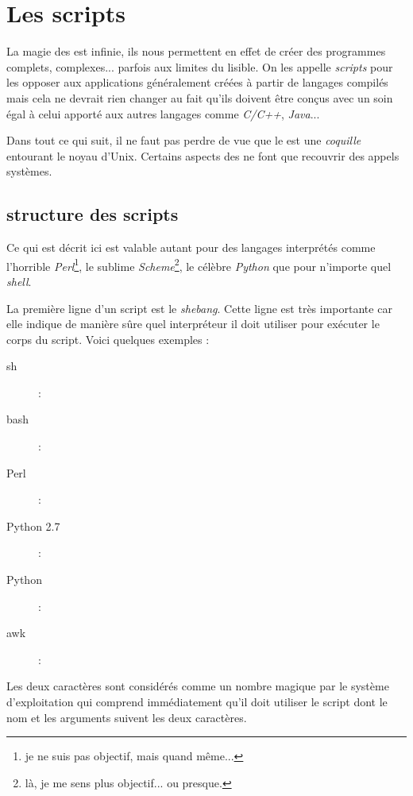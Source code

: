 
\section{Les scripts \shell}
La magie des \shells est infinie, ils nous permettent en effet de créer des programmes complets, complexes... parfois aux limites du lisible. On les appelle \emph{scripts} pour les opposer aux applications généralement créées à partir de langages compilés mais cela ne devrait rien changer au fait qu'ils doivent être conçus avec un soin égal à celui apporté aux autres langages comme \emph{C/C++}, \emph{Java}...

Dans tout ce qui suit, il ne faut pas perdre de vue que le \shell est une \emph{coquille} entourant le noyau d'Unix. Certains aspects des \shells ne font que recouvrir des appels systèmes.

\subsection{structure des scripts}
Ce qui est décrit ici est valable autant pour des langages interprétés comme l'horrible \emph{Perl}\footnote{je ne suis pas objectif, mais quand même...}, le sublime \emph{Scheme}\footnote{là, je me sens plus objectif... ou presque.}, le célèbre \emph{Python} que pour n'importe quel \emph{shell}.

La première ligne d'un script est le \emph{shebang}. Cette ligne est très importante car elle indique de manière sûre quel interpréteur il doit utiliser pour exécuter le corps du script. Voici quelques exemples :

\begin{description}
\item[sh] : 
\item[bash] : 
\item[Perl] : 
\item[Python 2.7] : 
\item[Python] : 
\item[awk] : 
\end{description}

Les deux caractères \code{\#!} sont considérés comme un nombre magique par le système d'exploitation qui comprend immédiatement qu'il doit utiliser le script dont le nom et les arguments suivent les deux caractères.

